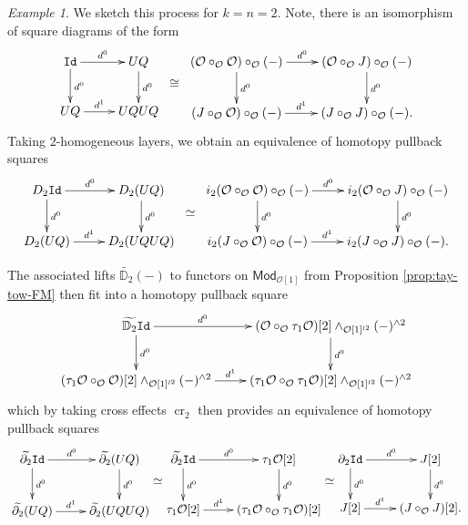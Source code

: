 \documentclass[11pt]{amsart}
\theoremstyle{definition}
\theoremstyle{remark}
\newtheorem{example}[subsection]{Example}
\newcommand{\cro}{\operatorname{cr}}
\newcommand{\Id}{\mathtt{Id}}
\newcommand{\Cal}[1]{\mathcal{#1}}
\begin{document}
\begin{example} \label{ex:C(O)} We sketch this process for $k=n=2$. Note, there is an isomorphism of square diagrams of the form \[ 
    \xymatrix{ \Id \ar[r]^-{d^0} \ar[d]^-{d^0} & UQ \ar[d]^-{d^0} \\ UQ \ar[r]^-{d^1} & UQUQ } \;\; \raisebox{-4ex}{$\cong$} \;\; 
    \xymatrix{ (\Cal{O} \circ_{\Cal{O}} \Cal{O}) \circ_{\Cal{O}} (-) \ar[r]^-{d^0} \ar[d]^-{d^0} &
        (\Cal{O} \circ_{\Cal{O}} J) \circ_{\Cal{O}} (-) \ar[d]^-{d^0} \\
        (J \circ_{\Cal{O}} \Cal{O}) \circ_{\Cal{O}} (-) \ar[r]^-{d^1} &
        (J \circ_{\Cal{O}} J)\circ_{\Cal{O}} (-).}\]
Taking $2$-homogeneous layers, we obtain an equivalence of homotopy pullback squares
\[ 
    \xymatrix{ D_2\Id \ar[r]^-{d^0} \ar[d]^-{d^0} & D_2(UQ) \ar[d]^-{d^0} \\ D_2(UQ) \ar[r]^-{d^1} & D_2(UQUQ) } \;\; \raisebox{-4ex}{$\simeq$} \;\; 
    \xymatrix{ i_2(\Cal{O} \circ_{\Cal{O}} \Cal{O}) \circ_{\Cal{O}} (-) \ar[r]^-{d^0} \ar[d]^-{d^0} &
        i_2(\Cal{O} \circ_{\Cal{O}} J) \circ_{\Cal{O}} (-) \ar[d]^-{d^0} \\
        i_2(J \circ_{\Cal{O}} \Cal{O}) \circ_{\Cal{O}} (-) \ar[r]^-{d^1} &
        i_2(J \circ_{\Cal{O}} J)\circ_{\Cal{O}} (-).}\]

The associated lifts $\widetilde{\mathbb{D}_2}(-)$ to functors on $\mathsf{Mod}_{\Cal{O}[1]}$ from Proposition \ref{prop:tay-tow-FM} then fit into a homotopy pullback square
\[ 
    \xymatrix{ 
        \widetilde{\mathbb{D}_2}\Id \ar[r]^-{d^0} \ar[d]^-{d^0} & 
        (\Cal{O}\circ_{\Cal{O}} \tau_1 \Cal{O})[2] \wedge_{\Cal{O}[1]^{\wr 2}} (-)^{\wedge 2} \ar[d]^-{d^0} \\
        (\tau_1 \Cal{O} \circ_{\Cal{O}} \Cal{O})[2] \wedge_{\Cal{O}[1]^{\wr 2}} (-)^{\wedge 2} \ar[r]^-{d^1} &
        (\tau_1 \Cal{O} \circ_{\Cal{O}} \tau_1 \Cal{O} )[2] \wedge_{\Cal{O}[1]^{\wr 2}} (-)^{\wedge 2}  }\]
which by taking cross effects $\cro_2$ then provides an equivalence of homotopy pullback squares 
\[ 
    \xymatrix{ \widetilde{\partial_2}\Id \ar[r]^-{d^0} \ar[d]^-{d^0} & \widetilde{\partial_2} (UQ) \ar[d]^-{d^0} \\ \widetilde{\partial_2}(UQ) \ar[r]^-{d^1} & \widetilde{\partial_2} (UQUQ) }  \raisebox{-4ex}{$\simeq$}  
    \xymatrix{ \widetilde{\partial_2} \Id \ar[d]^-{d^0} \ar[r]^-{d^0} &
        \tau_1 \Cal{O}[2] \ar[d]^-{d^0} \\
        \tau_1 \Cal{O} [2]\ar[r]^-{d^1} &
        (\tau_1\Cal{O} \circ_{\Cal{O}} \tau_1\Cal{O})[2]}
        \raisebox{-4ex}{$\simeq$} 
    \xymatrix{ \partial_2 \Id \ar[d]^-{d^0} \ar[r]^-{d^0} &
        J[2] \ar[d]^-{d^0} \\
        J[2]\ar[r]^-{d^1} &
        (J\circ_{\Cal{O}} J)[2].}\]
\end{example}
\end{document}
